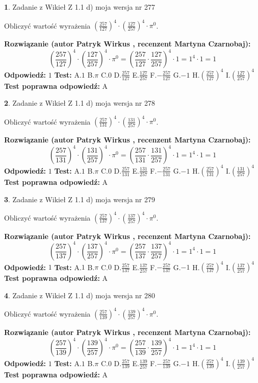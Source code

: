 \documentclass[12pt, a4paper]{article}
\theoremstyle{definition} %
\newtheorem{zad}{}
\newcommand{\zadStart}[1]{\begin{zad}#1\newline}
\newcommand{\zadStop}{\end{zad}}
\newcommand{\rozwStart}[2]{\noindent \textbf{Rozwiązanie (autor #1 , recenzent #2): }\newline}
\newcommand{\rozwStop}{\newline}
\newcommand{\odpStart}{\noindent \textbf{Odpowiedź:}\newline}
\newcommand{\odpStop}{\newline}
\newcommand{\testStart}{\noindent \textbf{Test:}\newline}
\newcommand{\testStop}{\newline}
\newcommand{\kluczStart}{\noindent \textbf{Test poprawna odpowiedź:}\newline}
\newcommand{\kluczStop}{\newline}
\begin{document}
\zadStart{Zadanie z Wikieł Z 1.1 d) moja wersja nr 277}

Obliczyć wartość wyrażenia $(\frac{257}{127})^{4} \cdot (\frac{127}{257})^{4} \cdot \pi^{0}$.
\zadStop
\rozwStart{Patryk Wirkus}{Martyna Czarnobaj}
$$(\frac{257}{127})^{4} \cdot (\frac{127}{257})^{4} \cdot \pi^{0} = (\frac{257}{127} \cdot \frac{127}{257})^{4} \cdot 1 = 1^{4} \cdot 1 = 1$$
\rozwStop
\odpStart
$1$
\odpStop
\testStart
A.$1$ B.$\pi$ C.$0$ D.$\frac{257}{127}$ E.$\frac{127}{257}$
F.$-\frac{257}{127}$ G.$-1$
H.$(\frac{257}{127})^{4}$
I.$(\frac{127}{257})^{4}$
\testStop
\kluczStart
A
\kluczStop



\zadStart{Zadanie z Wikieł Z 1.1 d) moja wersja nr 278}

Obliczyć wartość wyrażenia $(\frac{257}{131})^{4} \cdot (\frac{131}{257})^{4} \cdot \pi^{0}$.
\zadStop
\rozwStart{Patryk Wirkus}{Martyna Czarnobaj}
$$(\frac{257}{131})^{4} \cdot (\frac{131}{257})^{4} \cdot \pi^{0} = (\frac{257}{131} \cdot \frac{131}{257})^{4} \cdot 1 = 1^{4} \cdot 1 = 1$$
\rozwStop
\odpStart
$1$
\odpStop
\testStart
A.$1$ B.$\pi$ C.$0$ D.$\frac{257}{131}$ E.$\frac{131}{257}$
F.$-\frac{257}{131}$ G.$-1$
H.$(\frac{257}{131})^{4}$
I.$(\frac{131}{257})^{4}$
\testStop
\kluczStart
A
\kluczStop



\zadStart{Zadanie z Wikieł Z 1.1 d) moja wersja nr 279}

Obliczyć wartość wyrażenia $(\frac{257}{137})^{4} \cdot (\frac{137}{257})^{4} \cdot \pi^{0}$.
\zadStop
\rozwStart{Patryk Wirkus}{Martyna Czarnobaj}
$$(\frac{257}{137})^{4} \cdot (\frac{137}{257})^{4} \cdot \pi^{0} = (\frac{257}{137} \cdot \frac{137}{257})^{4} \cdot 1 = 1^{4} \cdot 1 = 1$$
\rozwStop
\odpStart
$1$
\odpStop
\testStart
A.$1$ B.$\pi$ C.$0$ D.$\frac{257}{137}$ E.$\frac{137}{257}$
F.$-\frac{257}{137}$ G.$-1$
H.$(\frac{257}{137})^{4}$
I.$(\frac{137}{257})^{4}$
\testStop
\kluczStart
A
\kluczStop



\zadStart{Zadanie z Wikieł Z 1.1 d) moja wersja nr 280}

Obliczyć wartość wyrażenia $(\frac{257}{139})^{4} \cdot (\frac{139}{257})^{4} \cdot \pi^{0}$.
\zadStop
\rozwStart{Patryk Wirkus}{Martyna Czarnobaj}
$$(\frac{257}{139})^{4} \cdot (\frac{139}{257})^{4} \cdot \pi^{0} = (\frac{257}{139} \cdot \frac{139}{257})^{4} \cdot 1 = 1^{4} \cdot 1 = 1$$
\rozwStop
\odpStart
$1$
\odpStop
\testStart
A.$1$ B.$\pi$ C.$0$ D.$\frac{257}{139}$ E.$\frac{139}{257}$
F.$-\frac{257}{139}$ G.$-1$
H.$(\frac{257}{139})^{4}$
I.$(\frac{139}{257})^{4}$
\testStop
\kluczStart
A
\kluczStop
\end{document}
